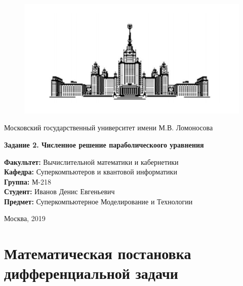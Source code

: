 \documentclass[12pt,a4paper]{scrartcl}
\begin{document}
\begin{titlepage}

    \begin{figure}[h]
        \centering
        \includegraphics[scale=0.5]{gzlogo_new.png}
    \end{figure}

    \begin{center}
        \large
        Московский государственный университет имени М.В. Ломоносова

        \vfill

        \LARGE
        \textbf{Задание 2. Численное решение параболическоого уравнения}

        \vfill

        \hfill\begin{minipage}{0.6\textwidth}
            \normalsize
            \textbf{Факультет:} Вычислительной математики и кабернетики \\
            \textbf{Кафедра:} Суперкомпьютеров и квантовой информатики \\
            \textbf{Группа:} М-218 \\
            \textbf{Студент:} Иванов Денис Евгеньевич \\
            \textbf{Предмет:} Суперкомпьютерное Моделирование и Технологии \\
        \end{minipage}
        \vfill

    \end{center}

    \begin{center}
        \large
        Москва, 2019
    \end{center}
\end{titlepage}

\section{Математическая постановка дифференциальной задачи}
\end{document}
